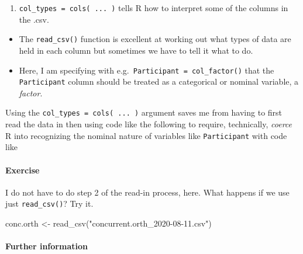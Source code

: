 \documentclass[
  letterpaper,
  DIV=11,
  numbers=noendperiod]{scrreprt}
\let\oldparagraph\paragraph
\renewcommand{\paragraph}[1]{\oldparagraph{#1}\mbox{}}
\newenvironment{Shaded}{\begin{snugshade}}{\end{snugshade}}
\newcommand{\FunctionTok}[1]{\textcolor[rgb]{0.28,0.35,0.67}{#1}}
\newcommand{\NormalTok}[1]{\textcolor[rgb]{0.00,0.23,0.31}{#1}}
\newcommand{\OtherTok}[1]{\textcolor[rgb]{0.00,0.23,0.31}{#1}}
\newcommand{\SpecialCharTok}[1]{\textcolor[rgb]{0.37,0.37,0.37}{#1}}
\newcommand{\StringTok}[1]{\textcolor[rgb]{0.13,0.47,0.30}{#1}}
\providecommand{\tightlist}{%
  \setlength{\itemsep}{0pt}\setlength{\parskip}{0pt}}\usepackage{longtable,booktabs,array}
\begin{document}
\begin{enumerate}
\def\labelenumi{\arabic{enumi}.}
\setcounter{enumi}{1}
\tightlist
\item
  \texttt{col\_types\ =\ cols(\ ...\ )} tells R how to interpret some of
  the columns in the .csv.
\end{enumerate}

\begin{itemize}
\tightlist
\item
  The \texttt{read\_csv()} function is excellent at working out what
  types of data are held in each column but sometimes we have to tell it
  what to do.
\item
  Here, I am specifying with e.g.~\texttt{Participant\ =\ col\_factor()}
  that the \texttt{Participant} column should be treated as a
  categorical or nominal variable, a \emph{factor}.
\end{itemize}

Using the \texttt{col\_types\ =\ cols(\ ...\ )} argument saves me from
having to first read the data in then using code like the following to
require, technically, \emph{coerce} R into recognizing the nominal
nature of variables like \texttt{Participant} with code like

\begin{Shaded}
\end{Shaded}

\hypertarget{sec-exercise-process}{%
\paragraph{Exercise}\label{sec-exercise-process}}

I do not have to do step 2 of the read-in process, here. What happens if
we use just \texttt{read\_csv()}? Try it.

\begin{Shaded}
\begin{Highlighting}[]
\NormalTok{conc.orth }\OtherTok{\textless{}{-}} \FunctionTok{read\_csv}\NormalTok{(}\StringTok{"concurrent.orth\_2020{-}08{-}11.csv"}\NormalTok{)}
\end{Highlighting}
\end{Shaded}

\hypertarget{further-information}{%
\paragraph{Further information}\label{further-information}}
\end{document}
